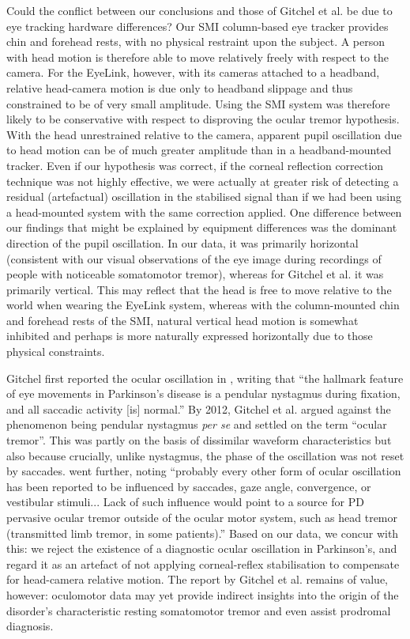 \documentclass[jou,a4paper]{apa6}
\begin{document}
Could the conflict between our conclusions and those of Gitchel et al. be due to eye tracking hardware differences? Our SMI column-based eye tracker provides chin and forehead rests, with no physical restraint upon the subject. A person with head motion is therefore able to move relatively freely with respect to the camera. For the EyeLink, however, with its cameras attached to a headband, relative head-camera motion is due only to headband slippage and thus constrained to be of very small amplitude. Using the SMI system was therefore likely to be conservative with respect to disproving the ocular tremor hypothesis. With the head unrestrained relative to the camera, apparent pupil oscillation due to head motion can be of much greater amplitude than in a headband-mounted tracker. Even if our hypothesis was correct, if the corneal reflection correction technique was not highly effective, we were actually at greater risk of detecting a residual (artefactual) oscillation in the stabilised signal than if we had been using a head-mounted system with the same correction applied. One difference between our findings that might be explained by equipment differences was the dominant direction of the pupil oscillation. In our data, it was primarily horizontal (consistent with our visual observations of the eye image during recordings of people with noticeable somatomotor tremor), whereas for Gitchel et al. it was primarily vertical. This may reflect that the head is free to move relative to the world when wearing the EyeLink system, whereas with the column-mounted chin and forehead rests of the SMI, natural vertical head motion is somewhat inhibited and perhaps is more naturally expressed horizontally due to those physical constraints.

Gitchel first reported the ocular oscillation in \citeyear{Gitchel2009Oculomotor-cont}, writing that ``the hallmark feature of eye movements in Parkinson's disease is a pendular nystagmus during fixation, and all saccadic activity [is] normal.'' By 2012, Gitchel et al. argued against the phenomenon being pendular nystagmus \textit{per se} and settled on the term ``ocular tremor''. This was partly on the basis of dissimilar waveform characteristics but also because crucially, unlike nystagmus, the phase of the oscillation was not reset by saccades. \citet{Leigh2013Tremor-of-the-e} went further, noting ``probably every other form of ocular oscillation has been reported to be influenced by saccades, gaze angle, convergence, or vestibular stimuli... Lack of such influence would point to a source for PD pervasive ocular tremor outside of the ocular motor system, such as head tremor (transmitted limb tremor, in some patients).'' Based on our data, we concur with this: we reject the existence of a diagnostic ocular oscillation in Parkinson's, and regard it as an artefact of not applying corneal-reflex stabilisation to compensate for head-camera relative motion. The report by Gitchel et al. remains of value, however: oculomotor data may yet provide indirect insights into the origin of the disorder's characteristic resting somatomotor tremor and even assist prodromal diagnosis.
\end{document}
